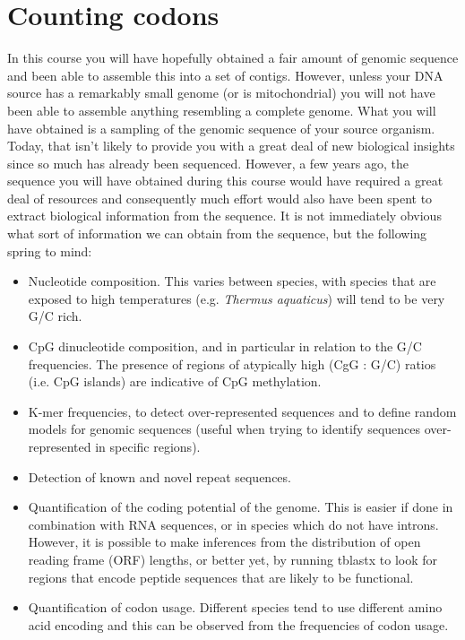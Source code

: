 \documentclass[11pt]{article}
\begin{document}
\section{Counting codons}
\label{sec-5}

In this course you will have hopefully obtained a fair amount of genomic sequence and
been able to assemble this into a set of contigs. However, unless your DNA source
has a remarkably small genome (or is mitochondrial) you will not have been able to
assemble anything resembling a complete genome. What you will have obtained is a sampling
of the genomic sequence of your source organism. Today, that isn't likely to provide you
with a great deal of new biological insights since so much has already been sequenced.
However, a few years ago, the sequence you will have obtained during this course would
have required a great deal of resources and consequently much effort would also have
been spent to extract biological information from the sequence.
It is not immediately obvious what sort of information we can obtain from the sequence,
but the following spring to mind:

\begin{itemize}
\item Nucleotide composition. This varies between species, with species that are exposed
to high temperatures (e.g. \emph{Thermus aquaticus}) will tend to be very G/C rich.

\item CpG dinucleotide composition, and in particular in relation to the G/C frequencies.
The presence of regions of atypically high (CgG : G/C) ratios (i.e. CpG islands)
are indicative of CpG methylation.

\item K-mer frequencies, to detect over-represented sequences and to define random models
for genomic sequences (useful when trying to identify sequences over-represented in
specific regions).

\item Detection of known and novel repeat sequences.

\item Quantification of the coding potential of the genome. This is easier if done in combination
with RNA sequences, or in species which do not have introns. However, it is possible to
make inferences from the distribution of open reading frame (ORF) lengths, or better yet, by
running tblastx to look for regions that encode peptide sequences
that are likely to be functional.

\item Quantification of codon usage. Different species tend to use different amino acid encoding
and this can be observed from the frequencies of codon usage.
\end{itemize}
\end{document}
